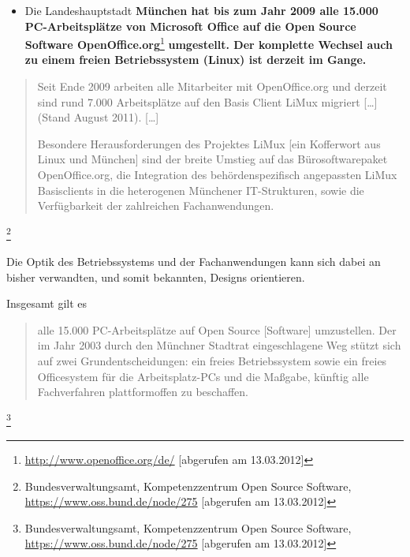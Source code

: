 \documentclass[a4paper]{scrartcl}
\begin{document}
\begin{itemize}
\begin{quote}
Das Gesetz verbietet den Einsatz von proprietärer Software nicht,
verlangt aber, dass Entscheidungen zusammen mit der staatlichen
IT-Behörde auf der Grundlage von Kosten, Support, offenen Standards
und Interoperabilität getroffen werden müssen. Auch dürften
Programme nicht unautorisiert Informationen übermitteln oder
staatliche Computer kontrollieren oder
modifizieren.\end{quote}\footnote{\url{http://www.heise.de/open/meldung/Open-Source-fuer-New-Hampshire-1431833.html}
[abgerufen am 09.02.2012], Hervorhebungen durch Christian
Nähle}

\item Die Landeshauptstadt \textbf{München hat bis zum Jahr 2009 alle 15.000
PC-Arbeitsplätze von Microsoft Office auf die Open Source Software
OpenOffice.org}\footnote{\url{http://www.openoffice.org/de/}
[abgerufen am 13.03.2012]}\textbf{ umgestellt. Der komplette Wechsel
auch zu einem freien Betriebssystem (Linux) ist derzeit im Gange.}
\end{itemize}

\begin{quote}Seit Ende 2009 arbeiten alle Mitarbeiter mit
OpenOffice.org und derzeit sind rund 7.000 Arbeitsplätze auf den
Basis Client LiMux migriert [\ldots] (Stand August 2011). [\ldots]

Besondere Herausforderungen des Projektes LiMux [ein Kofferwort aus Linux und
München] sind der breite Umstieg auf das Bürosoftwarepaket OpenOffice.org, die
Integration des behördenspezifisch angepassten LiMux Basisclients in die
heterogenen Münchener IT-Strukturen, sowie die Verfügbarkeit der zahlreichen
Fachanwendungen.
\end{quote}\footnote{Bundesverwaltungsamt, Kompetenzzentrum Open Source
  Software, \url{https://www.oss.bund.de/node/275} [abgerufen am 13.03.2012]}

Die Optik des Betriebssystems und der Fachanwendungen kann sich dabei an bisher
verwandten, und somit bekannten, Designs orientieren.

Insgesamt gilt es \begin{quote}alle 15.000 PC-Arbeitsplätze auf
Open Source [Software] umzustellen. Der im Jahr 2003 durch den
Münchner Stadtrat eingeschlagene Weg stützt sich auf zwei
Grundentscheidungen: ein freies Betriebssystem sowie ein freies
Officesystem für die Arbeitsplatz-PCs und die Maßgabe, künftig
alle Fachverfahren plattformoffen zu
beschaffen.\end{quote}\footnote{Bundesverwaltungsamt,
Kompetenzzentrum Open Source Software,
\url{https://www.oss.bund.de/node/275} [abgerufen am 13.03.2012]}
\end{document}
